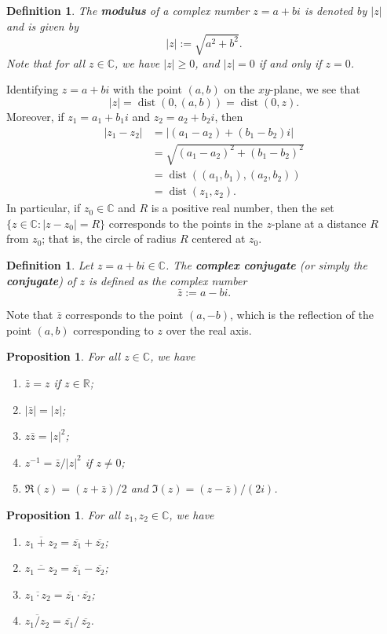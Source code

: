\documentclass[10pt]{article}
\newcommand{\R}{\mathbb{R}}
\newcommand{\C}{\mathbb{C}}
\DeclareMathOperator{\dist}{dist}
\theoremstyle{newstyle}
\newtheorem{prop}[thm]{Proposition}
\newtheorem{defn}[thm]{Definition}
\begin{document}
\begin{defn}
The {\bf modulus} of a complex number $z = a+bi$ is denoted by $|z|$ and is given by 
\[ |z| := \sqrt{a^2 + b^2}. \]
Note that for all $z \in \C$, we have $|z| \geq 0$, and $|z| = 0$ if and only if $z = 0$. 
\end{defn}

Identifying $z = a+bi$ with the point $(a, b)$ on the $xy$-plane, we see that 
\[ |z| = \dist(0, (a, b)) = \dist(0, z). \]
Moreover, if $z_1 = a_1+b_1i$ and $z_2 = a_2+b_2i$, then 
\begin{align*}
    |z_1-z_2| &= |(a_1-a_2)+(b_1-b_2)i| \\
    &= \sqrt{(a_1-a_2)^2 + (b_1-b_2)^2} \\
    &= \dist((a_1, b_1), (a_2, b_2)) \\
    &= \dist(z_1, z_2). 
\end{align*}
In particular, if $z_0 \in \C$ and $R$ is a positive real number, then the set 
$\{z \in \C : |z-z_0| = R\}$ corresponds to the points in the $z$-plane at a distance $R$ from 
$z_0$; that is, the circle of radius $R$ centered at $z_0$. 

\begin{defn}
Let $z = a+bi \in \C$. The {\bf complex conjugate} (or simply the {\bf conjugate}) of 
$z$ is defined as the complex number 
\[ \bar{z} := a-bi. \]
\end{defn}
Note that $\bar{z}$ corresponds to the point $(a, -b)$, which is the reflection of the point 
$(a, b)$ corresponding to $z$ over the real axis. 

\begin{prop}
For all $z \in \C$, we have 
\begin{enumerate}[(1)]
    \item $\bar{z} = z$ if $z \in \R$;
    \item $|\bar{z}| = |z|$;
    \item $z\bar{z} = |z|^2$;
    \item $z^{-1} = \bar{z}/|z|^2$ if $z \neq 0$; 
    \item $\Re(z) = (z + \bar{z})/2$ and $\Im(z) = (z-\bar{z})/(2i)$. 
\end{enumerate}
\end{prop}

\newpage 
\begin{prop}
For all $z_1, z_2 \in \C$, we have 
\begin{enumerate}[(1)]
    \item $\overline{z_1+z_2} = \overline{z_1} + \overline{z_2}$;
    \item $\overline{z_1-z_2} = \overline{z_1} - \overline{z_2}$;
    \item $\overline{z_1 \cdot z_2} = \overline{z_1} \cdot \overline{z_2}$;
    \item $\overline{z_1/z_2} = \overline{z_1} /\,\overline{z_2}$.
\end{enumerate}
\end{prop}
\end{document}
